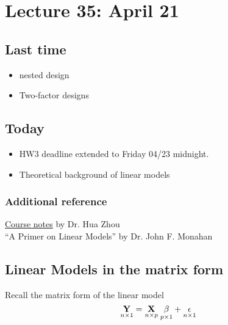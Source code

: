 \setcounter{section}{34}

\section{Lecture 35: April 21}


\subsection*{Last time}
\begin{itemize}
\item nested design
\item Two-factor designs
\end{itemize}


\subsection*{Today}
\begin{itemize}
\item HW3 deadline extended to Friday 04/23 midnight.
\item Theoretical background of linear models
\end{itemize}

\subsubsection*{Additional reference}
\href{http://hua-zhou.github.io/teaching/st552-2013fall/ST552-2013-Fall-LecNotes.pdf}{Course notes} by Dr. Hua Zhou\\
``A Primer on Linear Models'' by Dr. John F. Monahan

\subsection*{Linear Models in the matrix form}
Recall the matrix form of the linear model
$$
\underset{n \times 1}{\mathbf{Y}} = \underset{n \times p}{\mathbf{X}} \;  \underset{p \times 1}{\mathbf{\beta}} + \underset{n \times 1}{\mathbf{\epsilon}}
$$

